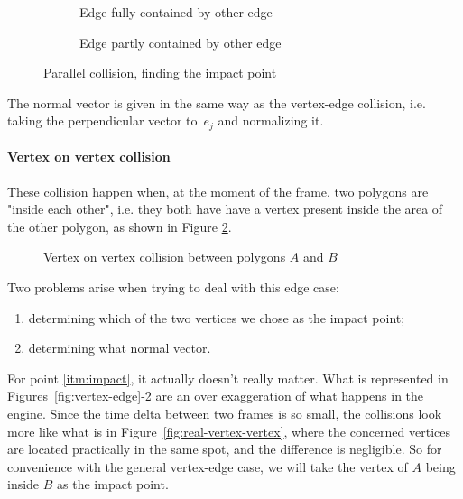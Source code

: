 \begin{figure}[H]
	\centering
	\begin{subfigure}[]{.5\textwidth}
		\centering
		\caption{Edge fully contained by other edge}
	\end{subfigure}
	\begin{subfigure}[]{.49\textwidth}
		\centering
		\caption{Edge partly contained by other edge}
	\end{subfigure}
	\caption{Parallel collision, finding the impact point}
	\label{fig:parallel-impact}
\end{figure}

The normal vector is given in the same way as the vertex-edge collision, i.e.
taking the perpendicular vector to~$e_j$ and normalizing it.

\paragraph{Vertex on vertex collision} These collision happen when, at the
moment of the frame, two polygons are "inside each other", i.e. they both have
have a vertex present inside the area of the other polygon, as shown in Figure
\ref{fig:vertex-vertex}.

\begin{figure}[H]
	\centering
	\caption{Vertex on vertex collision between polygons $A$ and $B$}
	\label{fig:vertex-vertex}
\end{figure}

\noindent
Two problems arise when trying to deal with this edge case:
\begin{enumerate}
	\item determining which of the two vertices we chose as the impact point;
	      \label{itm:impact}
	\item determining what normal vector.
	      \label{itm:normal}
\end{enumerate}

For point \ref{itm:impact}, it actually doesn't really matter. What is
represented in Figures~\ref{fig:vertex-edge}-\ref{fig:vertex-vertex} are an
over exaggeration of what happens in the engine. Since the time delta between
two frames is so small, the collisions look more like what is in
Figure~\ref{fig:real-vertex-vertex}, where the concerned vertices are located
practically in the same spot, and the difference is negligible. So for convenience
with the general vertex-edge case, we will take the vertex of $A$ being inside
$B$ as the impact point.

